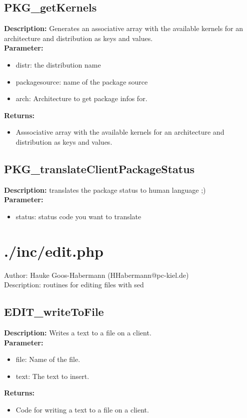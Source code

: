 \subsection{PKG\_getKernels}
\textbf{Description:} Generates an associative array with the available kernels for an architecture and distribution as keys and values.\\
\textbf{Parameter:}
\begin{itemize}
\item distr: the distribution name
\item packagesource: name of the package source
\item arch: Architecture to get package infos for.
\end{itemize}
\textbf{Returns:}
\begin{itemize}
\item Asssociative array with the available kernels for an architecture and distribution as keys and values.
\end{itemize}

\subsection{PKG\_translateClientPackageStatus}
\textbf{Description:} translates the package status to human language ;)\\
\textbf{Parameter:}
\begin{itemize}
\item status: status code you want to translate
\end{itemize}

\newpage\section{./inc/edit.php}
 Author: Hauke Goos-Habermann (HHabermann@pc-kiel.de)\\
 Description: routines for editing files with sed\\

\subsection{EDIT\_writeToFile}
\textbf{Description:} Writes a text to a file on a client.\\
\textbf{Parameter:}
\begin{itemize}
\item file: Name of the file.
\item text: The text to insert.
\end{itemize}
\textbf{Returns:}
\begin{itemize}
\item Code for writing a text to a file on a client.
\end{itemize}

